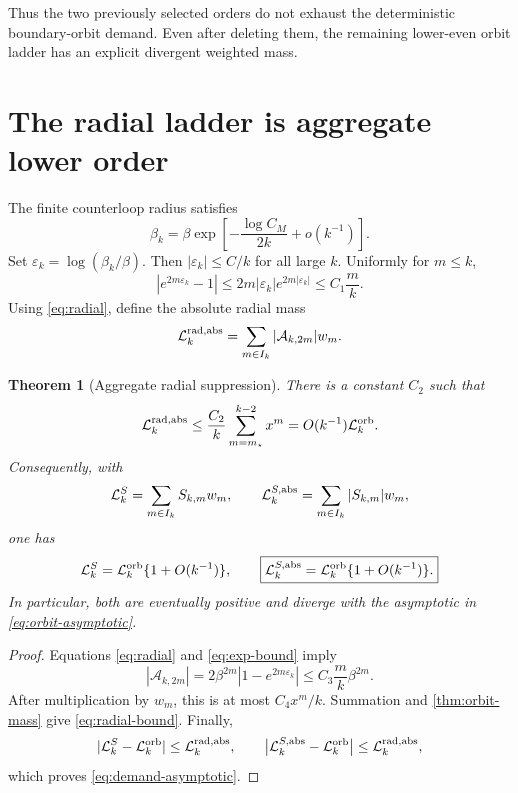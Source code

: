 \documentclass[11pt]{article}
\newtheorem{theorem}{Theorem}[section]
\theoremstyle{remark}
\newcommand{\cA}{\mathcal A}
\newcommand{\cL}{\mathcal L}
\begin{document}
Thus the two previously selected orders do not exhaust the deterministic
boundary-orbit demand.  Even after deleting them, the remaining lower-even
orbit ladder has an explicit divergent weighted mass.

\section{The radial ladder is aggregate lower order}

The finite counterloop radius satisfies
\begin{equation}\label{eq:beta-expansion}
 \beta_k
 =\beta\exp\left[-\frac{\log C_M}{2k}+o(k^{-1})\right].
\end{equation}
Set $\varepsilon_k=\log(\beta_k/\beta)$.  Then
$|\varepsilon_k|\le C/k$ for all large $k$.  Uniformly for $m\le k$,
\begin{equation}\label{eq:exp-bound}
 |e^{2m\varepsilon_k}-1|
 \le 2m|\varepsilon_k|e^{2m|\varepsilon_k|}
 \le C_1\frac{m}{k}.
\end{equation}
Using \eqref{eq:radial}, define the absolute radial mass
\begin{equation}\label{eq:Lrad}
 \cL_k^{\rm rad,abs}
 =\sum_{m\in I_k}|\cA_{k,2m}|w_m.
\end{equation}

\begin{theorem}[Aggregate radial suppression]\label{thm:radial}
There is a constant $C_2$ such that
\begin{equation}\label{eq:radial-bound}
 \cL_k^{\rm rad,abs}
 \le \frac{C_2}{k}\sum_{m=m_\star}^{k-2}x^m
 =O(k^{-1})\cL_k^{\rm orb}.
\end{equation}
Consequently, with
\begin{equation}\label{eq:demand-masses}
 \cL_k^{S}=\sum_{m\in I_k}S_{k,m}w_m,
 \qquad
 \cL_k^{S,\rm abs}=\sum_{m\in I_k}|S_{k,m}|w_m,
\end{equation}
one has
\begin{equation}\label{eq:demand-asymptotic}
 \cL_k^{S}=\cL_k^{\rm orb}\{1+O(k^{-1})\},
 \qquad
 \boxed{\cL_k^{S,\rm abs}=\cL_k^{\rm orb}\{1+O(k^{-1})\}.}
\end{equation}
In particular, both are eventually positive and diverge with the asymptotic
in \eqref{eq:orbit-asymptotic}.
\end{theorem}

\begin{proof}
Equations \eqref{eq:radial} and \eqref{eq:exp-bound} imply
\[
 |\cA_{k,2m}|
 =2\beta^{2m}|1-e^{2m\varepsilon_k}|
 \le C_3\frac{m}{k}\beta^{2m}.
\]
After multiplication by $w_m$, this is at most $C_4x^m/k$.  Summation and
\cref{thm:orbit-mass} give \eqref{eq:radial-bound}.  Finally,
\[
 |\cL_k^S-\cL_k^{\rm orb}|
 \le\cL_k^{\rm rad,abs},
 \qquad
 \bigl|\cL_k^{S,\rm abs}-\cL_k^{\rm orb}\bigr|
 \le\cL_k^{\rm rad,abs},
\]
which proves \eqref{eq:demand-asymptotic}.
\end{proof}
\end{document}
